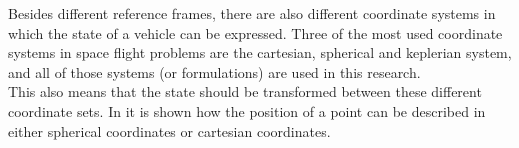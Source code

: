 
\noindent
Besides different reference frames, there are also different coordinate systems in which the state of a vehicle can be expressed. Three of the most used coordinate systems in space flight problems are the cartesian, spherical and keplerian system, and all of those systems (or formulations) are used in this research.\\ 
This also means that the state should be transformed between these different coordinate sets. In  it is shown how the position of a point can be described in either spherical coordinates or cartesian coordinates.

